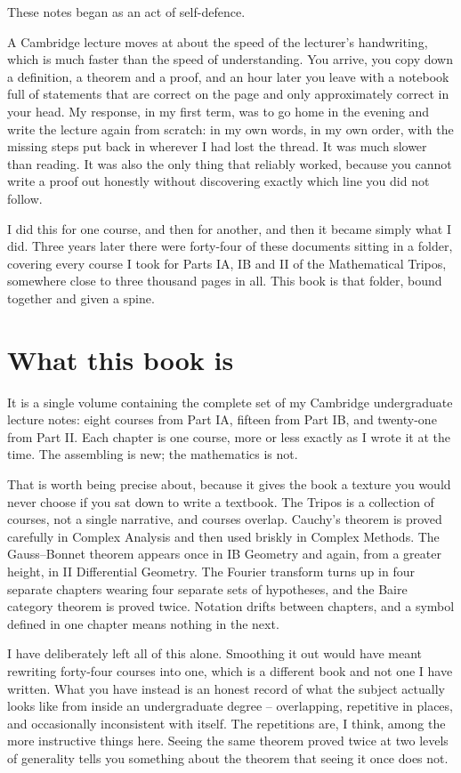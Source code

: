 
These notes began as an act of self-defence.

A Cambridge lecture moves at about the speed of the lecturer's handwriting, which is
much faster than the speed of understanding. You arrive, you copy down a definition, a
theorem and a proof, and an hour later you leave with a notebook full of statements
that are correct on the page and only approximately correct in your head. My response,
in my first term, was to go home in the evening and write the lecture again from
scratch: in my own words, in my own order, with the missing steps put back in wherever
I had lost the thread. It was much slower than reading. It was also the only thing that
reliably worked, because you cannot write a proof out honestly without discovering
exactly which line you did not follow.

I did this for one course, and then for another, and then it became simply what I did.
Three years later there were forty-four of these documents sitting in a folder,
covering every course I took for Parts IA, IB and II of the Mathematical Tripos,
somewhere close to three thousand pages in all. This book is that folder, bound
together and given a spine.

\section*{What this book is}

It is a single volume containing the complete set of my Cambridge undergraduate lecture
notes: eight courses from Part IA, fifteen from Part IB, and twenty-one from Part II\@.
Each chapter is one course, more or less exactly as I wrote it at the time. The
assembling is new; the mathematics is not.

That is worth being precise about, because it gives the book a texture you would never
choose if you sat down to write a textbook. The Tripos is a collection of courses, not
a single narrative, and courses overlap. Cauchy's theorem is proved carefully in
Complex Analysis and then used briskly in Complex Methods. The Gauss--Bonnet theorem
appears once in IB Geometry and again, from a greater height, in II Differential
Geometry. The Fourier transform turns up in four separate chapters wearing four
separate sets of hypotheses, and the Baire category theorem is proved twice. Notation
drifts between chapters, and a symbol defined in one chapter means nothing in the next.

I have deliberately left all of this alone. Smoothing it out would have meant rewriting
forty-four courses into one, which is a different book and not one I have written. What
you have instead is an honest record of what the subject actually looks like from
inside an undergraduate degree -- overlapping, repetitive in places, and occasionally
inconsistent with itself. The repetitions are, I think, among the more instructive
things here. Seeing the same theorem proved twice at two levels of generality tells you
something about the theorem that seeing it once does not.

